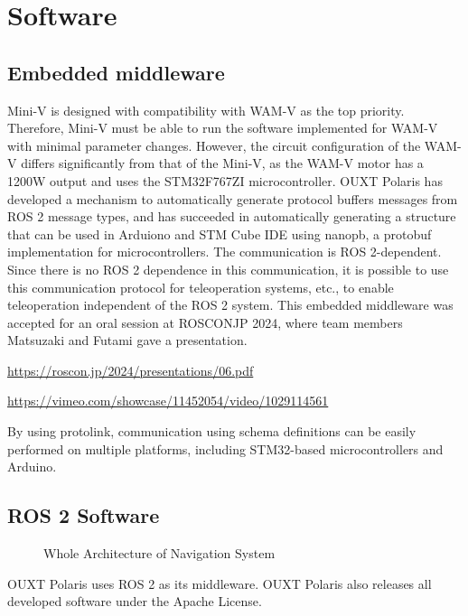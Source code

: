 \documentclass[lettersize,journal]{IEEEtran}
\begin{document}
\section{Software}

\subsection{Embedded middleware}

Mini-V is designed with compatibility with WAM-V as the top priority.
Therefore, Mini-V must be able to run the software implemented for WAM-V with minimal parameter changes.
However, the circuit configuration of the WAM-V differs significantly from that of the Mini-V, as the WAM-V motor has a 1200W output and uses the STM32F767ZI microcontroller.
OUXT Polaris has developed a mechanism to automatically generate protocol buffers messages from ROS 2 message types, and has succeeded in automatically generating a structure that can be used in Arduiono and STM Cube IDE using nanopb, a protobuf implementation for microcontrollers. The communication is ROS 2-dependent.
Since there is no ROS 2 dependence in this communication, it is possible to use this communication protocol for teleoperation systems, etc., to enable teleoperation independent of the ROS 2 system.
This embedded middleware was accepted for an oral session at ROSCONJP 2024, where team members Matsuzaki and Futami gave a presentation.

\url{https://roscon.jp/2024/presentations/06.pdf}

\url{https://vimeo.com/showcase/11452054/video/1029114561}

By using protolink, communication using schema definitions can be easily performed on multiple platforms, including STM32-based microcontrollers and Arduino.

\subsection{ROS 2 Software}

\begin{figure}[H]
  \begin{center}
  \end{center}
  \caption{Whole Architecture of Navigation System}
  \label{fig:arch_nav}
\end{figure}

OUXT Polaris uses ROS 2 as its middleware.
OUXT Polaris also releases all developed software under the Apache License.
\end{document}
